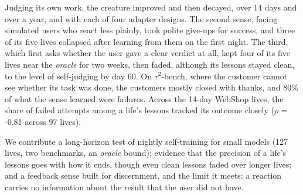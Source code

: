 Judging its own work, the creature improved and then decayed, over 14 days and over a year, and with each of four adapter designs. The second sense, facing simulated users who react less plainly, took polite give-ups for success, and three of its five lives collapsed after learning from them on the first night. The third, which first asks whether the user gave a clear verdict at all, kept four of its five lives near the \emph{oracle} for two weeks, then faded, although its lessons stayed clean, to the level of self-judging by day 60. On $\tau^2$-bench, where the customer cannot see whether its task was done, the customers mostly closed with thanks, and 80\% of what the sense learned were failures. Across the 14-day WebShop lives, the share of failed attempts among a life's lessons tracked its outcome closely ($\rho$ = -0.81 across 97 lives).

We contribute a long-horizon test of nightly self-training for small models (127 lives, two benchmarks, an \emph{oracle} bound); evidence that the precision of a life's lessons goes with how it ends, though even clean lessons faded over longer lives; and a feedback sense built for discernment, and the limit it meets: a reaction carries no information about the result that the user did not have.
